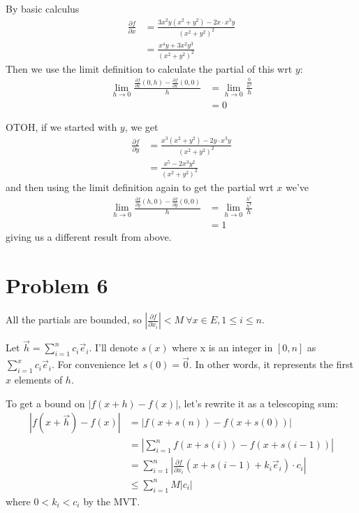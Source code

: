 \documentclass[12pt]{article}
\begin{document}
By basic calculus
\begin{align*}
  \frac{\partial f}{\partial x}
   & = \frac{3x^2y\left(x^2+y^2\right)-2x \cdot x^3y}{\left(x^2+y^2\right)^2} \\
   & = \frac{x^4y+3x^2y^3}{\left(x^2+y^2\right)^2}
\end{align*}
Then we use the limit definition to calculate the partial of this wrt $y$:
\begin{align*}
  \lim_{h \to 0} \frac{\frac{\partial f}{\partial x}(0, h)-\frac{\partial f}{\partial x}(0, 0)}{h}
   & = \lim_{h \to 0} \frac{\frac{0}{h^4}}{h} \\
   & = 0
\end{align*}

OTOH, if we started with $y$, we get
\begin{align*}
  \frac{\partial f}{\partial y}
   & = \frac{x^3\left(x^2+y^2\right)-2y \cdot x^3y}{\left(x^2+y^2\right)^2} \\
   & = \frac{x^5-2x^3y^2}{\left(x^2+y^2\right)^2}
\end{align*}
and then using the limit definition again to get the partial wrt $x$ we've
\begin{align*}
  \lim_{h \to 0} \frac{\frac{\partial f}{\partial y}(h, 0)-\frac{\partial f}{\partial y}(0, 0)}{h}
   & = \lim_{h \to 0} \frac{\frac{h^5}{h^4}}{h} \\
   & = 1
\end{align*}
giving us a different result from above.

\pagebreak

\section{Problem 6}

All the partials are bounded, so
$\left|\frac{\partial f}{\partial x_i}\right| < M\ \forall x \in E, 1 \le i \le n$.

Let $\vec{h}=\sum_{i=1}^{n} c_i\vec{e}_i$.
I'll denote $s(x)$ where x is an integer in $[0, n]$ as $\sum_{i=1}^{x} c_i\vec{e}_i$.
For convenience let $s(0)=\vec{0}$.
In other words, it represents the first $x$ elements of $h$.

To get a bound on $|f(x+h)-f(x)|$, let's rewrite it as a telescoping sum:
\begin{align*}
  |f(x+\vec{h})-f(x)|
   & = |f(x+s(n))-f(x+s(0))|                                                                        \\
   & = \left|\sum_{i=1}^{n} f(x+s(i))-f(x+s(i-1))\right|                                            \\
   & = \sum_{i=1}^{n} \left|\frac{\partial f}{\partial x_i}(x+s(i-1)+k_i\vec{e}_i) \cdot c_i\right| \\
   & \le \sum_{i=1}^{n} M|c_i|
\end{align*}
where $0 < k_i < c_i$ by the MVT.
\end{document}
